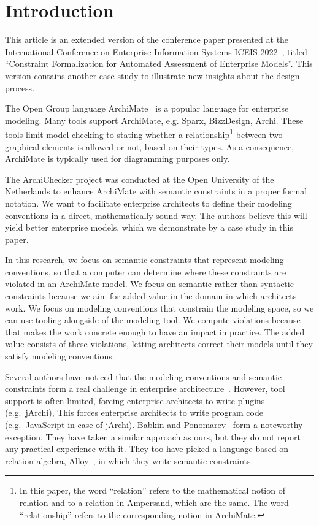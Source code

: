 \documentclass[sn-vancouver]{sn-jnl}%
\begin{document}
\maketitle

\section{Introduction}\label{sec1}
This article is an extended version of the conference paper presented at the International Conference on Enterprise Information Systems ICEIS-2022~\cite{iceis22},
titled ``Constraint Formalization for Automated Assessment of Enterprise Models''.
This version contains another case study to illustrate new insights about the design process.

The Open Group language ArchiMate~\cite{ArchiMate} is a popular language for enterprise modeling.
Many tools support ArchiMate, e.g. Sparx, BizzDesign, Archi.
These tools limit model checking to stating whether a relationship\footnote{In this paper, the word ``relation'' refers to the mathematical notion of relation and to a relation in Ampersand, which are the same.
The word ``relationship'' refers to the corresponding notion in ArchiMate.} between two graphical elements is allowed or not, based on their types.
As a consequence, ArchiMate is typically used for diagramming purposes only.

The ArchiChecker project was conducted at the Open University of the Netherlands to enhance ArchiMate with semantic constraints in a proper formal notation.
We want to facilitate enterprise architects to define their modeling conventions in a direct, mathematically sound way.
The authors believe this will yield better enterprise models, which we demonstrate by a case study in this paper.

In this research, we focus on semantic constraints that represent modeling conventions,
so that a computer can determine where these constraints are violated in an ArchiMate model.
We focus on semantic rather than syntactic constraints because we aim for added value in the domain in which architects work.
We focus on modeling conventions that constrain the modeling space, so we can use tooling alongside of the modeling tool.
We compute violations because that makes the work concrete enough to have an impact in practice.
The added value consists of these violations, letting architects correct their models until they satisfy modeling conventions.

Several authors have noticed that the modeling conventions and semantic constraints
form a real challenge in enterprise architecture~\cite{kharlamov2016capturing,chatzikonstantinou2012policy,ramos2014automated,bider2020structural}.
However, tool support is often limited, forcing enterprise architects to write plugins (e.g.~jArchi),
This forces enterprise architects to write program code (e.g.~JavaScript in case of jArchi).
Babkin and Ponomarev~\cite{babkin2017analysis} form a noteworthy exception.
They have taken a similar approach as ours, but they do not report any practical experience with it.
They too have picked a language based on relation algebra, Alloy~\cite{Alloy2006}, in which they write semantic constraints.
\end{document}
